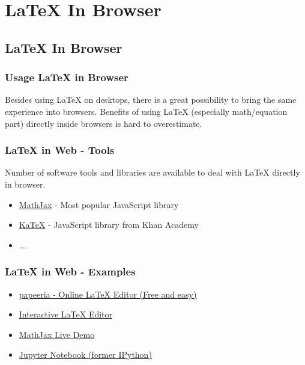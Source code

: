 \documentclass[slidestop,compress,mathserif]{beamer}
\begin{document}
\section[LaTeX In Browser]{LaTeX In Browser}
\subsection{LaTeX In Browser}
	
	\begin{frame} \frametitle{Usage LaTeX in Browser}
		Besides using LaTeX on desktops, there is a great possibility to bring the same experience into browsers. Benefits of using LaTeX (especially math/equation part) directly inside browsers is hard to overestimate.
	\end{frame}
	
	\begin{frame} \frametitle{LaTeX in Web - Tools}
		Number of software tools and libraries are available to deal with LaTeX directly in browser.\\
		
		\begin{itemize}
			\item \href{https://www.mathjax.org/}{MathJax} - Most popular JavaScript library
			\item \href{https://khan.github.io/KaTeX/}{KaTeX} - JavaScript library from Khan Academy
			\item ...
		\end{itemize}
	
	\end{frame}
	
		\begin{frame} \frametitle{LaTeX in Web - Examples}
			
			\begin{itemize}
				\item \href{http://www.papeeria.com/}{papeeria - Online LaTeX Editor (Free and easy)}
				\item \href{http://arachnoid.com/latex/}{Interactive LaTeX Editor}
				\item \href{https://github.com/mathjax/MathJax/blob/master/test/sample-dynamic-2.html}{MathJax Live Demo}
				\item \href{https://ipython.org/ipython-doc/3/install/install.html\#mathjax}{Jupyter Notebook (former IPython)}
			\end{itemize}
			
		\end{frame}
\end{document}
